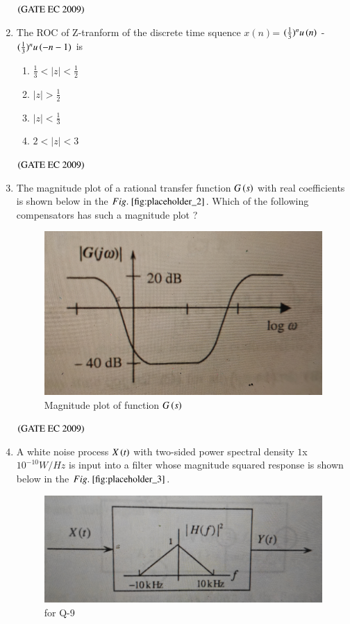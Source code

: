 \documentclass[journal,12pt,onecolumn]{IEEEtran}
\theoremstyle{remark}
\begin{document}
\begin{enumerate}[start=1, label={Q\arabic*.}]
\begin{enumerate}
\end{enumerate}
\hfill $\left(\text{GATE EC 2009}\right)$

\item The ROC of Z-tranform of the discrete time squence $x(n)$= $(\frac{1}{3})^nu\left(n\right)$ - $(\frac{1}{3})^n u\left(-n-1\right)$ is 

\begin{enumerate}
\item $\frac{1}{3} <|z| <\frac{1}{2}$
\item $|z| >\frac{1}{2}$
\item $|z| <\frac{1}{3}$
\item $2<|z|<3$
\end{enumerate}
\hfill $\left(\text{GATE EC 2009}\right)$

\item The magnitude plot of a rational transfer function $G\left(s\right)$ with real coefficients is shown below in the $\figref{fig:placeholder_2}$. Which of the following compensators has such a magnitude plot ?

\begin{figure}[H]
    \centering
    \includegraphics[width=0.5\columnwidth]{figs/img_2.jpg}
    \caption{Magnitude plot of function $G\left(s\right)$ }
    \label{fig:placeholder_2}
\end{figure}


\begin{enumerate}
\end{enumerate}
\hfill $\left(\text{GATE EC 2009}\right)$
\item A white noise process $X\left(t\right)$ with two-sided power spectral density $1$x $10^{-10} W/Hz$ is input into a filter whose magnitude squared response is shown below in the $\figref{fig:placeholder_3}$.
\begin{figure}[H]
    \centering
    \includegraphics[width=0.5\columnwidth]{figs/img_3.jpg}
    \caption{for Q-9}
    \label{fig:placeholder_3}
\end{figure}


\end{enumerate}
\end{document}

